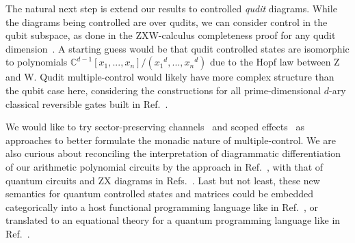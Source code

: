 The natural next step is extend our results to controlled \textit{qudit} diagrams.
While the diagrams being controlled are over qudits, we can consider control in the qubit subspace, as done in the ZXW-calculus completeness proof for any qudit dimension~\cite{poor2023completeness}.
A starting guess would be that qudit controlled states are isomorphic to polynomials $\mathbb{C}^{d-1}[x_1,...,x_n]/({x_1}^d,...,{x_n}^d)$ due to the Hopf law between Z and W.
Qudit multiple-control would likely have more complex structure than the qubit case here, considering the constructions for all prime-dimensional $d$-ary classical reversible gates built in Ref.~\cite{Roy2023quditzh}.

We would like to try sector-preserving channels~\cite{Vanrietvelde2021ctrlsector} and scoped effects~\cite{lindley2024scoped} as approaches to better formulate the monadic nature of multiple-control.
We are also curious about reconciling the interpretation of diagrammatic differentiation of our arithmetic polynomial circuits by the approach in Ref.~\cite{wilson2023diffpolycirc}, with that of quantum circuits and ZX diagrams in Refs.~\cite{toumi2021diagdiff, wang2022diffintzx, jeandel2024adddiffzx}.
Last but not least, these new semantics for quantum controlled states and matrices could be embedded categorically into a host functional programming language like in Ref.~\cite{rennela2020clctrllinlogic}, or translated to an equational theory for a quantum programming language like in Ref.~\cite{staton2015algqpl}.